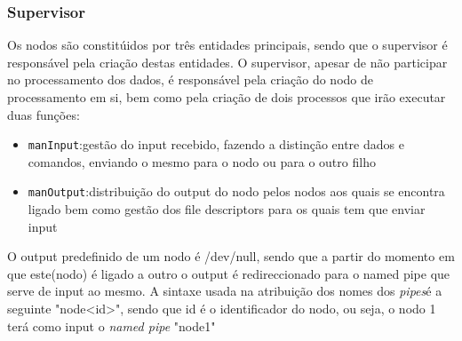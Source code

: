 \documentclass[12pt]{article}
\begin{document}
\subsubsection{Supervisor}
Os nodos são constitúidos por três entidades principais, sendo que o supervisor é responsável pela criação destas entidades.
O supervisor, apesar de não participar no processamento dos dados, é responsável pela criação do nodo de processamento em si, bem como pela criação de dois processos que irão executar duas funções: 
\begin{itemize}
\item \texttt{manInput}:gestão do input recebido, fazendo a distinção entre dados e comandos, enviando o mesmo para o nodo ou para o outro filho
\item \texttt{manOutput}:distribuição do output do nodo pelos nodos aos quais se encontra ligado bem como gestão dos file descriptors para os quais tem que enviar input
\end{itemize}
O output predefinido de um nodo é /dev/null, sendo que a partir do momento em que este(nodo) é ligado a outro o output é redireccionado para o named pipe que serve de input ao mesmo. A sintaxe usada na atribuição dos nomes dos \textit{pipes}é a seguinte "node<id>", sendo que id é o identificador do nodo, ou seja, o nodo 1 terá como input o \textit{named pipe} "node1"

\newpage
\end{document}
